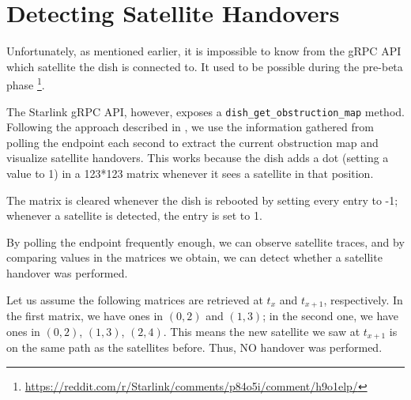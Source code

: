 \documentclass[IN,11pt,twoside,openright,idp,english]{tumthesis}
\begin{document}
\section{Detecting Satellite Handovers}

Unfortunately, as mentioned earlier, it is impossible to know from the gRPC API which satellite the dish is connected to. It used to be possible during the pre-beta phase \footnote{\url{https://reddit.com/r/Starlink/comments/p84o5i/comment/h9o1elp/}}.

The Starlink gRPC API, however, exposes a \texttt{dish\_get\_obstruction\_map} method. Following the approach described in \cite{izhikevich2023democratizing}, we use the information gathered from polling the endpoint each second to extract the current obstruction map and visualize satellite handovers. This works because the dish adds a dot (setting a value to 1) in a 123*123 matrix whenever it sees a satellite in that position. 

The matrix is cleared whenever the dish is rebooted by setting every entry to -1; whenever a satellite is detected, the entry is set to 1. 

By polling the endpoint frequently enough, we can observe satellite traces, and by comparing values in the matrices we obtain, we can detect whether a satellite handover was performed.


Let us assume the following matrices are retrieved at $ t_x $ and $ t_{x+1} $, respectively. In the first matrix, we have ones in $ (0,2) $ and $ (1,3) $; in the second one, we have ones in $ (0,2) $, $ (1,3) $, $ (2,4) $. This means the new satellite we saw at $ t_{x+1} $ is on the same path as the satellites before. Thus, NO handover was performed. \vspace{10mm}
\end{document}

